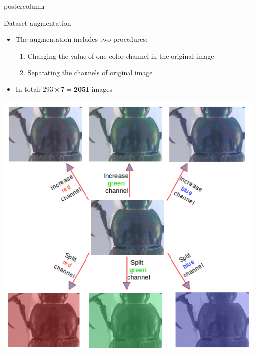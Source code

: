 \begin{frame}
\begin{columns}
\begin{column}{.49\textwidth}
\begin{beamercolorbox}[center,wd=\textwidth]{postercolumn}
\begin{minipage}[T]{.95\textwidth}
{            \vfill
            
            \begin{block}{Dataset augmentation}
            	\begin{itemize}
            		\item[] The augmentation includes two procedures:
            			\begin{enumerate}
            				\item Changing the value of one color channel in the original image
            				\item Separating the channels of original image	
			           	\end{enumerate}
					\item[] In total: $293 \times 7 = \textbf{2051}$ images 
            	\end{itemize}
            \centering
            
            \includegraphics[width=.6\textwidth]{images/data_aug.png}
            \end{block}
            
            \vfill
            
}
\end{minipage}
\end{beamercolorbox}
\end{column}
\end{columns}
\end{frame}
